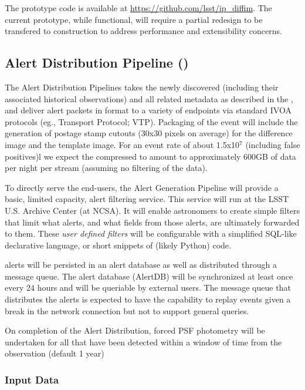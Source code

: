 The prototype code is available at \url{https://github.com/lsst/ip_diffim}. The current prototype, while functional, will require a partial redesign to be transfered to construction to address performance and extensibility concerns.

\clearpage

\subsection{Alert Distribution Pipeline (\wbsAP)}

The Alert Distribution Pipelines takes the newly discovered \DIAObjects (including their associated historical observations) and all related metadata as described in the \DPDD, and deliver alert packets in \VOEvent format to a variety of endpoints via standard IVOA protocols (eg., \VOEvent Transport Protocol; VTP\@). Packaging of the event will include the generation of postage stamp cutouts (30x30 pixels on average) for the difference image and the template image. For an event rate of about 1.5x10$^7$ (including false positives)l we expect the compressed \VOEvents to amount to approximately 600GB of data per night per \VOEvent stream (assuming no filtering of the data). 

To directly serve the end-users, the Alert Generation Pipeline will provide a basic, limited capacity, alert filtering service. This service will run at the LSST U.S. Archive Center (at NCSA). It will enable astronomers to create simple filters that limit what alerts, and what fields from those alerts, are ultimately forwarded to them. These \emph{user defined filters} will be configurable with a simplified SQL-like declarative language, or short snippets of (likely Python) code.

\VOEvent alerts will be persisted in an alert database as well as distributed through a message queue. The alert database (AlertDB) will be synchronized at least once every 24 hours and will be queriable by external users. The message queue that distributes the alerts is expected to have the capability  to replay events given a break in the network connection but not to support general queries.

On completion of the Alert Distribution, forced PSF photometry will be undertaken for all \DIAObjects that have been detected within a window of time from the observation (default 1 year)

\subsubsection{Input Data}
\label{sec:apADInput}

